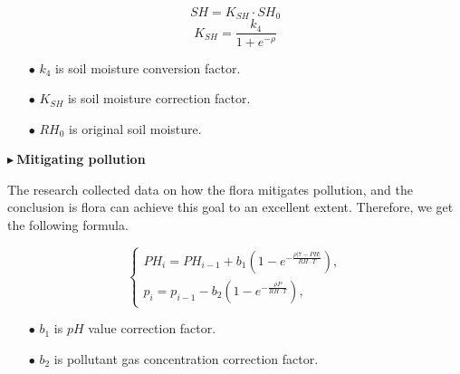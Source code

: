 \documentclass[12pt]{article}  %
\newenvironment{shrinkeq}[1]
{ \bgroup
	\addtolength\abovedisplayshortskip{#1}
	\addtolength\abovedisplayskip{#1}
	\addtolength\belowdisplayshortskip{#1}
	\addtolength\belowdisplayskip{#1}}
{\egroup\ignorespacesafterend}
\begin{document}
\begin{shrinkeq}{-1ex}
	\begin{equation}
    \label{eq:eq17}
    SH=K_{SH}\cdot SH_0
	\end{equation}
\end{shrinkeq}
\begin{shrinkeq}{-1ex}
	\begin{equation}
    \label{eq:eq18}
    K_{SH}=\frac{k_4}{1+e^{-\rho}}
	\end{equation}
\end{shrinkeq}

\begin{itemize}
\vspace{-0.2cm}
\item[$\bullet$] \textbf{$k_4$ }is soil moisture conversion factor.

\vspace{-0.2cm}
\item[$\bullet$] \textbf{$K_{SH}$ }is soil moisture correction factor.

\vspace{-0.2cm}
\item[$\bullet$] \textbf{$RH_0$ }is original soil moisture.
\end{itemize}

\vspace{-0.5cm}
\noindent$\blacktriangleright\ $\textbf{\small{Mitigating pollution}}

The research{\cite{7}} collected data on how the flora mitigates pollution, and the conclusion is flora can achieve this goal to an excellent extent. Therefore, we get the following formula.

\begin{shrinkeq}{-1ex}
	\begin{equation}
    \label{eq:eq19}
     \left\{\begin{array}{l}
     PH_i=PH_{i-1}+b_1(1-e^{-\frac{\rho |7-PH|}{RH\cdot T}}),\\
     p_i=p_{i-1}-b_2(1-e^{-\frac{\rho P}{RH\cdot T}}),
    \end{array}\right.
	\end{equation}
\end{shrinkeq}

\begin{itemize}
\vspace{-0.2cm}
\item[$\bullet$] \textbf{$b_1$ }is $pH$ value correction factor.

\vspace{-0.2cm}
\item[$\bullet$] \textbf{$b_2$ }is pollutant gas concentration correction factor.
\end{itemize}
\end{document}
